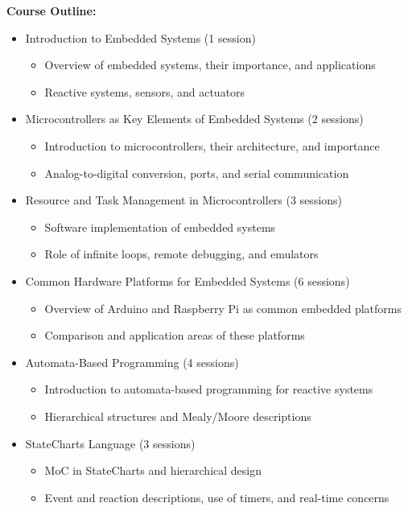 \documentclass[12pt]{article}
\begin{document}
\textbf{Course Outline:}
\begin{itemize}
    \item Introduction to Embedded Systems (1 session)
    \begin{itemize}
        \item Overview of embedded systems, their importance, and applications
        \item Reactive systems, sensors, and actuators
    \end{itemize}
    \item Microcontrollers as Key Elements of Embedded Systems (2 sessions)
    \begin{itemize}
        \item Introduction to microcontrollers, their architecture, and importance
        \item Analog-to-digital conversion, ports, and serial communication
    \end{itemize}
    \item Resource and Task Management in Microcontrollers (3 sessions)
    \begin{itemize}
        \item Software implementation of embedded systems
        \item Role of infinite loops, remote debugging, and emulators
    \end{itemize}
    \item Common Hardware Platforms for Embedded Systems (6 sessions)
    \begin{itemize}
        \item Overview of Arduino and Raspberry Pi as common embedded platforms
        \item Comparison and application areas of these platforms
    \end{itemize}
    \item Automata-Based Programming (4 sessions)
    \begin{itemize}
        \item Introduction to automata-based programming for reactive systems
        \item Hierarchical structures and Mealy/Moore descriptions
    \end{itemize}
    \item StateCharts Language (3 sessions)
    \begin{itemize}
        \item MoC in StateCharts and hierarchical design
        \item Event and reaction descriptions, use of timers, and real-time concerns

\end{itemize}
\end{itemize}
\end{document}
